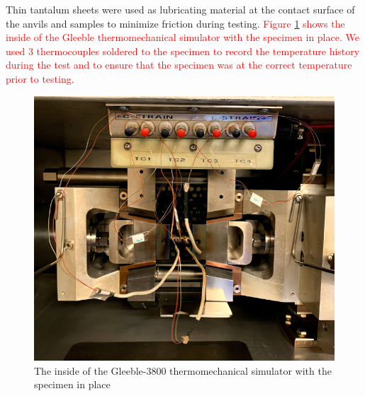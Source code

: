 \documentclass[metals,article,submit,pdftex,moreauthors]{Definitions/mdpi}
\begin{document}
Thin tantalum sheets were used as lubricating material at the contact surface of the anvils and samples to minimize friction during testing.
\textcolor{red}{Figure \ref{fig:Inside-Gleeble3800} shows the inside of the Gleeble thermomechanical simulator with the specimen in place. We used 3 thermocouples soldered to the specimen to record the temperature history during the test and to ensure that the specimen was at the correct temperature prior to testing.}
\begin{figure}[!ht]
\centering
\includegraphics[width=0.7\columnwidth]{Figures/Gleeble-1}
\caption{The inside of the Gleeble-3800 thermomechanical simulator with the specimen in place}
\label{fig:Inside-Gleeble3800}
\end{figure}
\end{document}
